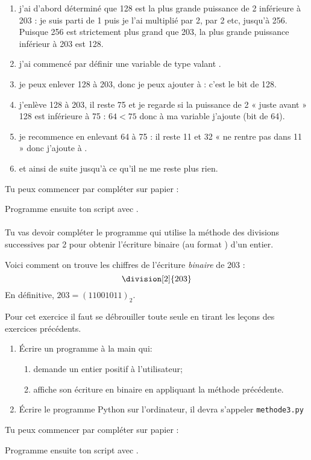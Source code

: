 \documentclass[a4paper,12pt,french]{book}
\begin{document}
\begin{enumerate}[--]
	\item 	j'ai d'abord déterminé que 128 est la plus grande puissance de 2 inférieure à 203 : je suis parti de 1 puis je l'ai multiplié par 2, par 2 etc, jusqu'à 256. Puisque 256 est strictement plus grand que 203, la plus grande puissance inférieur à 203 est 128.  
	\item 	j'ai commencé par définir une variable  de type  valant .
    \item   je peux enlever 128 à 203, donc je peux ajouter  à  : c'est le bit de 128.
    \item   j'enlève 128 à 203, il reste 75 et je regarde si la puissance de 2 « juste avant » 128 est inférieure à 75 : $64<75$ donc à ma variable  j'ajoute  (bit de 64).
    \item   je recommence en enlevant 64 à 75 : il reste 11 et 32 « ne rentre pas dans 11 » donc j'ajoute  à .
    \item et ainsi de suite jusqu'à ce qu'il ne me reste plus rien.
    
\end{enumerate}

Tu peux commencer par compléter sur papier :


Programme ensuite ton script avec .\\

\exo{}\\

Tu vas devoir compléter le programme  qui utilise la méthode des divisions successives par 2 pour obtenir l'écriture binaire (au format ) d'un entier.
\newpage
\begin{methode}
Voici comment on trouve les chiffres de l'écriture \textit{binaire} de 203 :
$$\division[2]{203}$$
En définitive, $203=(11001011)_2$.
\end{methode}



	Pour cet exercice il faut se \og débrouiller tout\cdot e seul\cdot e\fg{} en tirant les leçons des exercices précédents.
\begin{enumerate}[\bfseries 1.]
	\item 	\'Ecrire un programme à la main qui:
	\begin{enumerate}[--]
		\item 	demande un entier positif à l'utilisateur;
		\item 	affiche son écriture en binaire en appliquant la méthode précédente.
	\end{enumerate}
	\item 	\'Ecrire le programme Python sur l'ordinateur, il devra s'appeler \texttt{methode3.py}	
\end{enumerate}
Tu peux commencer par compléter sur papier :


Programme ensuite ton script avec .
\end{document}
